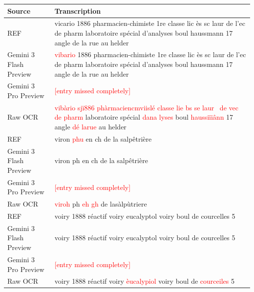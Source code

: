 \begin{table}
\centering
\small
\renewcommand{\arraystretch}{1.2}
\begin{tabularx}{\linewidth}{lX}
\hline
\textbf{Source} & \textbf{Transcription} \\
\hline

REF &
vicario 1886 pharmacien-chimiste 1re classe lic ès sc laur de l'ec de pharm laboratoire spécial d'analyses
boul haussmann 17 angle de la rue au helder \\

Gemini 3 Flash Preview &
\textcolor{red}{vibario} 1886 pharmacien-chimiste 1re classe lic ès sc laur de l'ec de pharm laboratoire spécial d'analyses
boul haussmann 17 angle de la rue au helder \\

Gemini 3 Pro Preview &
\textcolor{red}{[entry missed completely]} \\

Raw OCR &
\textcolor{red}{vibàrio sjï886 phàrmaciencmviislé classe lie bs se laur~ de vec de pharm}
laboratoire spécial \textcolor{red}{dana lyses}
boul \textcolor{red}{haussiïiânn} 17 angle \textcolor{red}{dé larue} au helder \\

\hline

REF &
viron \textcolor{red}{phu} en ch de la salpêtrière \\

Gemini 3 Flash Preview &
viron ph en ch de la salpêtrière \\

Gemini 3 Pro Preview &
\textcolor{red}{[entry missed completely]} \\

Raw OCR &
\textcolor{red}{viroh} ph \textcolor{red}{eh gh} de lasàlpùtriere \\

\hline

REF &
voiry 1888 réactif voiry eucalyptol voiry boul de courcelles 5 \\

Gemini 3 Flash Preview &
voiry 1888 réactif voiry eucalyptol voiry boul de courcelles 5 \\

Gemini 3 Pro Preview &
\textcolor{red}{[entry missed completely]} \\

Raw OCR &
voiry 1888 réactif voiry \textcolor{red}{èucalypiol} voiry
boul de \textcolor{red}{courceiles} 5 \\


\end{tabularx}
\end{table}
